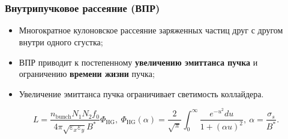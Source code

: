 \section{} %

\begin{frame}
	\frametitle{Внутрипучковое рассеяние (ВПР)}
	\begin{itemize}
		\item Многократное кулоновское рассеяние заряженных частиц друг с другом внутри одного сгустка;
		\item ВПР приводит к постепенному \textbf{увеличению эмиттанса пучка} и ограничению \textbf{времени жизни} пучка;
		\item Увеличение эмиттанса пучка ограничивает светимость коллайдера.
	\end{itemize}
	\vspace{0.5cm} 
	\begin{equation}
		L=\frac{n_{\mathrm{bunch}}N_1N_2f_0}{4\pi\sqrt{\varepsilon_x\varepsilon_y}B^\ast}\Phi_{\textrm{HG}}, \
		\Phi_{\textrm{HG}}(\alpha)=\frac{2}{\sqrt\pi}\int_{0}^{\infty}\frac{e^{-u^2}du}{1+(\alpha u)^2},\
		\alpha=\frac{\sigma_s}{B^\ast}.
		\label{eq:luminocity}
	\end{equation}
\end{frame}
